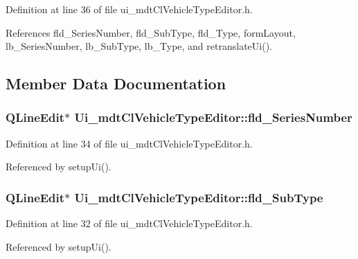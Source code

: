 Definition at line 36 of file ui\-\_\-mdt\-Cl\-Vehicle\-Type\-Editor.\-h.



References fld\-\_\-\-Series\-Number, fld\-\_\-\-Sub\-Type, fld\-\_\-\-Type, form\-Layout, lb\-\_\-\-Series\-Number, lb\-\_\-\-Sub\-Type, lb\-\_\-\-Type, and retranslate\-Ui().



\subsection{Member Data Documentation}
\hypertarget{class_ui__mdt_cl_vehicle_type_editor_aa2538616b1e55429786e5eb82ed603dc}{
\subsubsection[{fld\-\_\-\-Series\-Number}]{\setlength{\rightskip}{0pt plus 5cm}Q\-Line\-Edit$\ast$ Ui\-\_\-mdt\-Cl\-Vehicle\-Type\-Editor\-::fld\-\_\-\-Series\-Number}}\label{class_ui__mdt_cl_vehicle_type_editor_aa2538616b1e55429786e5eb82ed603dc}


Definition at line 34 of file ui\-\_\-mdt\-Cl\-Vehicle\-Type\-Editor.\-h.



Referenced by setup\-Ui().

\hypertarget{class_ui__mdt_cl_vehicle_type_editor_a3c780fa693f1f87ecb2573f2491faa9f}{
\subsubsection[{fld\-\_\-\-Sub\-Type}]{\setlength{\rightskip}{0pt plus 5cm}Q\-Line\-Edit$\ast$ Ui\-\_\-mdt\-Cl\-Vehicle\-Type\-Editor\-::fld\-\_\-\-Sub\-Type}}\label{class_ui__mdt_cl_vehicle_type_editor_a3c780fa693f1f87ecb2573f2491faa9f}


Definition at line 32 of file ui\-\_\-mdt\-Cl\-Vehicle\-Type\-Editor.\-h.



Referenced by setup\-Ui().


